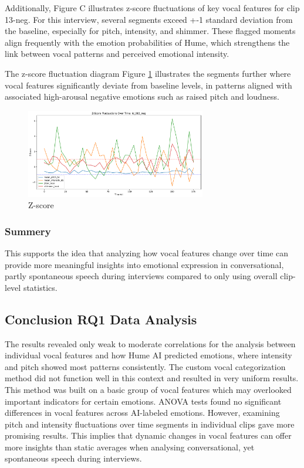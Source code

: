 Additionally, Figure C illustrates z-score fluctuations of key vocal features for clip 13-neg. For this interview, several segments exceed +-1 standard deviation from the baseline, especially for pitch, intensity, and shimmer. These flagged moments align frequently with the emotion probabilities of Hume, which strengthens the link between vocal patterns and perceived emotional intensity. 

The z-score fluctuation diagram Figure \ref{fig:z-score-15} illustrates the segments further where vocal features significantly deviate from baseline levels, in patterns aligned with associated high-arousal negative emotions such as raised pitch and loudness. 

\begin{figure}[H]
    \centering 
    \includegraphics[width=0.7\textwidth]{png/results/rq1/zscore_fluctuations_id_015_neg.pdf}
    \caption{Z-score}
    \label{fig:z-score-15}
\end{figure}

\subsubsection{Summery}
This supports the idea that analyzing how vocal features change over time  can provide more meaningful insights into emotional expression in conversational, partly spontaneous speech during interviews compared to only using overall clip-level statistics.

\subsection{Conclusion RQ1 Data Analysis}
The results revealed only weak to moderate correlations for the analysis between individual vocal features and how Hume AI predicted emotions, where intensity and pitch showed most patterns consistently. 
The custom vocal categorization method did not function well in this context and resulted in very uniform results. This method was built on a basic group of vocal features which may overlooked important indicators for certain emotions. 
ANOVA tests found no significant differences in vocal features across AI-labeled emotions. However, examining pitch and intensity fluctuations over time segments in individual clips gave more promising results. This implies that dynamic changes in vocal features 
can offer more insights than static averages when analysing conversational, yet spontaneous speech during interviews. 

